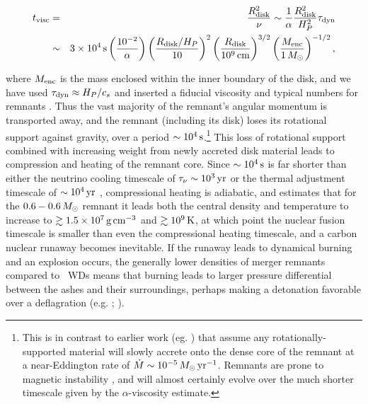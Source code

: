 \begin{eqnarray}
t_\mrm{visc} &=& \frac{R_\mrm{disk}^2}{\nu} \sim \frac{1}{\alpha}\frac{R_\mrm{disk}^2}{H_P^2}\taudyn \nonumber \\
			&\sim& 3\times10^4\,\mrm{s}\left(\frac{10^{-2}}{\alpha}\right)\left(\frac{R_\mrm{disk}/H_P}{10}\right)^2\left(\frac{R_\mrm{disk}}{10^9\,\mrm{cm}}\right)^{3/2}\left(\frac{M_\mrm{enc}}{1\,\Msun}\right)^{-1/2},
\end{eqnarray}

\noindent where $M_\mathrm{enc}$ is the mass enclosed within the inner boundary of the disk, and we have used $\taudyn \approx H_P/c_s$ and inserted a fiducial viscosity and typical numbers for remnants \citep{shen+12}.  Thus the vast majority of the remnant's angular momentum is transported away, and the remnant (including its disk) loses its rotational support against gravity, over a period $\sim10^4\,\mathrm{s}$.\footnote{This is in contrast to earlier work (eg. \citealt{nomoi85, yoonpr07}) that assume any rotationally-supported material will slowly accrete onto the dense core of the remnant at a near-Eddington rate of $\dot{M} \sim 10^{-5}\,\Msun\,\pyr$.  Remnants are prone to magnetic instability \citep{shen+12,ji+13}, and will almost certainly evolve over the much shorter timescale given by the $\alpha$-viscosity estimate.}  This loss of rotational support combined with increasing weight from newly accreted disk material leads to compression and heating of the remnant core.  Since $\sim10^4\,\mathrm{s}$ is far shorter than either the neutrino cooling timescale of $\taunu \sim 10^3\,\mrm{yr}$ or the thermal adjustment timescale of $\sim10^4\,\mathrm{yr}$ \citep{shen+12}, compressional heating is adiabatic, and \citeal{vkercj10} estimates that for the $0.6-0.6\,\Msun$ remnant it leads both the central density and temperature to increase to $\gtrsim1.5\times10^7\,\gcc$ and $\gtrsim10^9\,\mathrm{K}$, at which point the nuclear fusion timescale is smaller than even the compressional heating timescale, and a carbon nuclear runaway becomes inevitable.  If the runaway leads to dynamical burning and an explosion occurs, the generally lower densities of merger remnants compared to \Mch\ WDs means that burning leads to larger pressure differential between the ashes and their surroundings, perhaps making a detonation favorable over a deflagration (e.g. \citealt{mazumw77}; \citealt{seit+09}).

